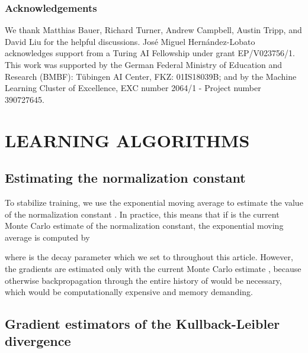 \documentclass[twoside]{article}
\begin{document}
\subsubsection*{Acknowledgements}
We thank Matthias Bauer, Richard Turner, Andrew Campbell, Austin Tripp, and David Liu for the helpful discussions.
Jos\'e Miguel Hern\'andez-Lobato acknowledges support from a Turing AI Fellowship under grant EP/V023756/1.
This work was supported by the German Federal Ministry of Education and Research (BMBF): Tübingen AI Center, FKZ: 01IS18039B; and by the Machine Learning Cluster of Excellence, EXC number 2064/1 - Project number 390727645. 








\clearpage
\appendix

\thispagestyle{empty}


\onecolumn \makesupplementtitle



\section{LEARNING ALGORITHMS}
\label{sec:a_learn_alg}

\subsection{Estimating the normalization constant}
\label{sec:ml_learn}

To stabilize training, we use the exponential moving average to estimate the value of the normalization constant \citep{Bauer2019}. In practice, this means that if  is the current Monte Carlo estimate of the normalization constant, the exponential moving average  is computed by

where  is the decay parameter which we set to  throughout this article. However, the gradients are estimated only with the current Monte Carlo estimate , because otherwise backpropagation through the entire history of  would be necessary, which would be computationally expensive and memory demanding.


\subsection{Gradient estimators of the Kullback-Leibler divergence}
\label{sec:rkld_proof}
\end{document}
